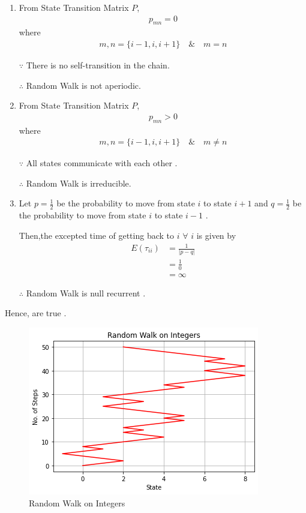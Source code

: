 \documentclass[journal,12pt,twocolumn]{IEEEtran}
\begin{document}
\begin{enumerate}
    \item From State Transition Matrix $P$,
      \begin{align}
        p_{mn} = 0
    \end{align}
    where
    \begin{align}
        m,n=\{i-1,i,i+1\} \quad \& \quad m = n
    \end{align}
    
    $\because$ There is no self-transition in the chain.
    
    $\therefore$ Random Walk is not aperiodic.

    \item From State Transition Matrix $P$,
    \begin{align}
        p_{mn} > 0  
    \end{align}
    where
    \begin{align}
        m,n=\{i-1,i,i+1\} \quad \& \quad m \neq n
    \end{align}
     
    $\because$ All states communicate with each other .

    $\therefore$ Random Walk is irreducible.

    \item Let $p=\frac{1}{2}$ be the probability to move from state $i$ to state $i+1$ and $q=\frac{1}{2}$ be the probability to move from state $i$ to state $i-1$ .

    Then,the excepted time of getting back to $i$ $\forall$ $i$ is given by 
    \begin{align}
       E(\tau_{ii}) &= \frac{1}{|p-q|} \\
       &=\frac{1}{0} \\
       &= \infty
    \end{align}

    $\therefore$ Random Walk is null recurrent .

\end{enumerate}

Hence,  are true .

\begin{figure}[!ht]
\centering
\includegraphics[width=\columnwidth]{Figure18}
\caption{Random Walk on Integers}
\label{Random Walk}	
\end{figure}
\end{document}
